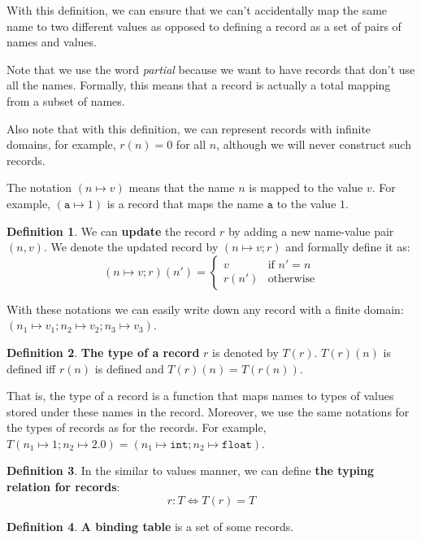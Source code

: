 \documentclass[14pt]{constructor-thesis}
\theoremstyle{definition}
\newtheorem*{definition}{Definition}
\begin{document}
With this definition, we can ensure that we can't accidentally map the same name to two different values as opposed to defining a record as a set of pairs of names and values.

Note that we use the word \textit{partial} because we want to have records that don't use all the names. Formally, this means that a record is actually a total mapping from a subset of names.

Also note that with this definition, we can represent records with infinite domains, for example, $r(n) = 0$ for all $n$, although we will never construct such records.

The notation $(n \mapsto v)$ means that the name $n$ is mapped to the value $v$. For example, $(\mathtt{a} \mapsto 1)$ is a record that maps the name $\mathtt{a}$ to the value $1$.

\begin{definition}
  We can \textbf{update} the record $r$ by adding a new name-value pair $(n, v)$. We denote the updated record by $(n \mapsto v; r)$ and formally define it as:
  $$
  (n \mapsto v; r)(n') = \begin{cases}
    v & \text{if } n' = n \\
    r(n') & \text{otherwise}
  \end{cases}
  $$
\end{definition}

With these notations we can easily write down any record with a finite domain: $(n_1 \mapsto v_1; n_2 \mapsto v_2; n_3 \mapsto v_3)$.

\begin{definition}
  \textbf{The type of a record} $r$ is denoted by $T(r)$. $T(r)(n)$ is defined iff $r(n)$ is defined and $T(r)(n) = T(r(n))$.
\end{definition}

That is, the type of a record is a function that maps names to types of values stored under these names in the record. Moreover, we use the same notations for the types of records as for the records. For example, $T(n_1 \mapsto 1; n_2 \mapsto 2.0) = (n_1 \mapsto \mathtt{int}; n_2 \mapsto \mathtt{float})$.

\begin{definition}
  In the similar to values manner, we can define \textbf{the typing relation for records}:
  $$ r : T \Longleftrightarrow T(r) = T $$
\end{definition}

\begin{definition}
  \textbf{A binding table} is a set of some records.
\end{definition}
\end{document}
